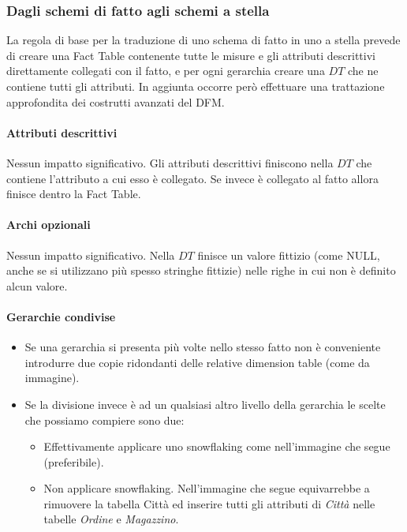 \subsubsection{Dagli schemi di fatto agli schemi a stella}
La regola di base per la traduzione di uno schema di fatto in uno a stella prevede di creare una Fact Table contenente tutte le misure e gli attributi descrittivi direttamente collegati con il fatto, e per ogni gerarchia creare una $DT$ che ne contiene tutti gli attributi.\newline
In aggiunta occorre però effettuare una trattazione approfondita dei costrutti avanzati del DFM.

\paragraph{Attributi descrittivi}
Nessun impatto significativo. Gli attributi descrittivi finiscono nella $DT$ che contiene l'attributo a cui esso è collegato. Se invece è collegato al fatto allora finisce dentro la Fact Table.
\paragraph{Archi opzionali}
Nessun impatto significativo. Nella $DT$ finisce un valore fittizio (come NULL, anche se si utilizzano più spesso stringhe fittizie) nelle righe in cui non è definito alcun valore.
\paragraph{Gerarchie condivise}
\begin{itemize}
	\item Se una gerarchia si presenta più volte nello stesso fatto non è conveniente introdurre due copie ridondanti delle relative dimension table (come da immagine).
	\item Se la divisione invece è ad un qualsiasi altro livello della gerarchia le scelte che possiamo compiere sono due:
	\begin{itemize}
		\item Effettivamente applicare uno snowflaking come nell'immagine che segue (preferibile).
		\item Non applicare snowflaking. Nell'immagine che segue equivarrebbe a rimuovere la tabella Città ed inserire tutti gli attributi di \textit{Città} nelle tabelle \textit{Ordine} e \textit{Magazzino}.
	\end{itemize}
\end{itemize}
